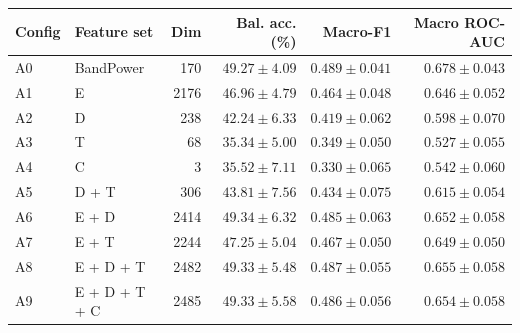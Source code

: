 \begin{tabular}{llrrrr}
\hline
Config & Feature set & Dim & Bal. acc. (\%) & Macro-F1 & Macro ROC-AUC \\
\hline
A0 & BandPower & 170 & $49.27 \pm 4.09$ & $0.489 \pm 0.041$ & $0.678 \pm 0.043$ \\
A1 & E & 2176 & $46.96 \pm 4.79$ & $0.464 \pm 0.048$ & $0.646 \pm 0.052$ \\
A2 & D & 238 & $42.24 \pm 6.33$ & $0.419 \pm 0.062$ & $0.598 \pm 0.070$ \\
A3 & T & 68 & $35.34 \pm 5.00$ & $0.349 \pm 0.050$ & $0.527 \pm 0.055$ \\
A4 & C & 3 & $35.52 \pm 7.11$ & $0.330 \pm 0.065$ & $0.542 \pm 0.060$ \\
A5 & D + T & 306 & $43.81 \pm 7.56$ & $0.434 \pm 0.075$ & $0.615 \pm 0.054$ \\
A6 & E + D & 2414 & $49.34 \pm 6.32$ & $0.485 \pm 0.063$ & $0.652 \pm 0.058$ \\
A7 & E + T & 2244 & $47.25 \pm 5.04$ & $0.467 \pm 0.050$ & $0.649 \pm 0.050$ \\
A8 & E + D + T & 2482 & $49.33 \pm 5.48$ & $0.487 \pm 0.055$ & $0.655 \pm 0.058$ \\
A9 & E + D + T + C & 2485 & $49.33 \pm 5.58$ & $0.486 \pm 0.056$ & $0.654 \pm 0.058$ \\
\hline
\end{tabular}
